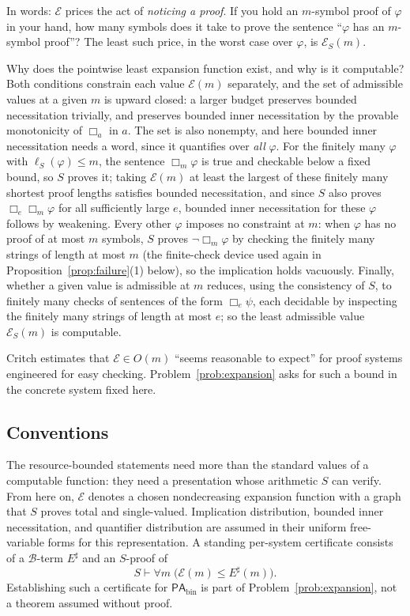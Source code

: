 \documentclass[11pt]{amsart}
\theoremstyle{plain}
\theoremstyle{definition}
\newcommand{\PAbin}{\mathsf{PA}_{\mathrm{bin}}}
\newcommand{\Bud}{\mathcal{B}}
\begin{document}
In words: $\mathcal{E}$ prices the act of \emph{noticing a proof}. If you hold an $m$-symbol proof of $\varphi$ in your hand, how many symbols does it take to prove the sentence ``$\varphi$ has an $m$-symbol proof''? The least such price, in the worst case over $\varphi$, is $\mathcal{E}_S(m)$.

Why does the pointwise least expansion function exist, and why is it computable? Both conditions constrain each value $\mathcal{E}(m)$ separately, and the set of admissible values at a given $m$ is upward closed: a larger budget preserves bounded necessitation trivially, and preserves bounded inner necessitation by the provable monotonicity of $\Box_a$ in $a$. The set is also nonempty, and here bounded inner necessitation needs a word, since it quantifies over \emph{all} $\varphi$. For the finitely many $\varphi$ with $\ell_S(\varphi) \le m$, the sentence $\Box_m\varphi$ is true and checkable below a fixed bound, so $S$ proves it; taking $\mathcal{E}(m)$ at least the largest of these finitely many shortest proof lengths satisfies bounded necessitation, and since $S$ also proves $\Box_e\Box_m\varphi$ for all sufficiently large $e$, bounded inner necessitation for these $\varphi$ follows by weakening. Every other $\varphi$ imposes no constraint at $m$: when $\varphi$ has no proof of at most $m$ symbols, $S$ proves $\neg\Box_m\varphi$ by checking the finitely many strings of length at most $m$ (the finite-check device used again in Proposition~\ref{prop:failure}(1) below), so the implication holds vacuously. Finally, whether a given value is admissible at $m$ reduces, using the consistency of $S$, to finitely many checks of sentences of the form $\Box_e\psi$, each decidable by inspecting the finitely many strings of length at most $e$; so the least admissible value $\mathcal{E}_S(m)$ is computable.

Critch estimates that $\mathcal{E} \in O(m)$ ``seems reasonable to expect'' for proof systems engineered for easy checking. Problem~\ref{prob:expansion} asks for such a bound in the concrete system fixed here.

\subsection{Conventions}
\label{sec:conventions}

The resource-bounded statements need more than the standard values of a computable function: they need a presentation whose arithmetic $S$ can verify. From here on, $\mathcal{E}$ denotes a chosen nondecreasing expansion function with a graph that $S$ proves total and single-valued. Implication distribution, bounded inner necessitation, and quantifier distribution are assumed in their uniform free-variable forms for this representation. A standing per-system certificate consists of a $\Bud$-term $E^\sharp$ and an $S$-proof of
\[
S\vdash \forall m\;\bigl(\mathcal{E}(m)\le E^\sharp(m)\bigr).
\]
Establishing such a certificate for $\PAbin$ is part of Problem~\ref{prob:expansion}, not a theorem assumed without proof.
\end{document}
